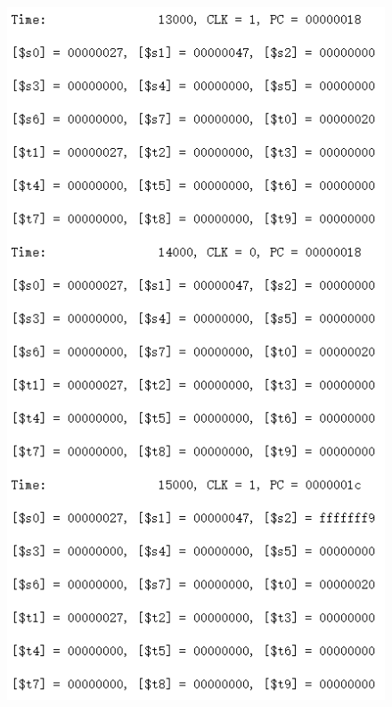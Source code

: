 \documentclass[12pt]{article}
\begin{document}
\begin{figure}[H]
\centering
\includegraphics[scale=1]{R5.jpg}
\end{figure}
\end{document}
